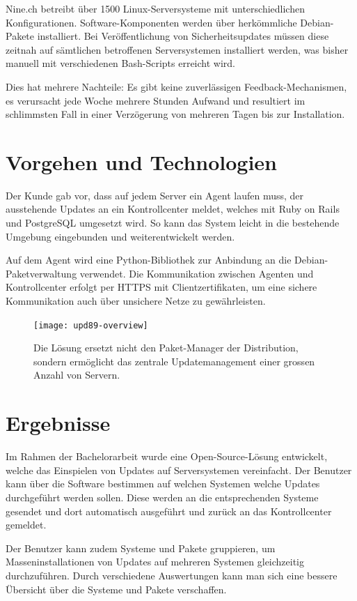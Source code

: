 Nine.ch betreibt über 1500 Linux-Serversysteme mit unterschiedlichen Konfigurationen. Software-Komponenten werden über herkömmliche Debian-Pakete installiert. Bei Veröffentlichung von Sicherheitsupdates müssen diese zeitnah auf sämtlichen betroffenen Serversystemen installiert werden, was bisher manuell mit verschiedenen Bash-Scripts erreicht wird.

Dies hat mehrere Nachteile: Es gibt keine zuverlässigen Feedback-Mechanismen, es verursacht jede Woche mehrere Stunden Aufwand und resultiert im schlimmsten Fall in einer Verzögerung von mehreren Tagen bis zur Installation.

\section*{Vorgehen und Technologien}

Der Kunde gab vor, dass auf jedem Server ein Agent laufen muss, der ausstehende Updates an ein Kontrollcenter meldet, welches mit Ruby on Rails und PostgreSQL umgesetzt wird. So kann das System leicht in die bestehende Umgebung eingebunden und weiterentwickelt werden. 

Auf dem Agent wird eine Python-Bibliothek zur Anbindung an die Debian-Paketverwaltung verwendet. Die Kommunikation zwischen Agenten und Kontrollcenter erfolgt per HTTPS mit Clientzertifikaten, um eine sichere Kommunikation auch über unsichere Netze zu gewährleisten.

\begin{figure}
  \centering
    \texttt{[image: upd89-overview]}
  \caption{Die Lösung ersetzt nicht den Paket-Manager der Distribution, sondern ermöglicht das zentrale Updatemanagement einer grossen Anzahl von Servern.}
  \label{fig:overview}
\end{figure}

\section*{Ergebnisse}   

Im Rahmen der Bachelorarbeit wurde eine Open-Source-Lösung entwickelt, welche das Einspielen von Updates auf Serversystemen vereinfacht. Der Benutzer kann über die Software bestimmen auf welchen Systemen welche Updates durchgeführt werden sollen. Diese werden an die entsprechenden Systeme gesendet und dort automatisch ausgeführt und zurück an das Kontrollcenter gemeldet.


Der Benutzer kann zudem Systeme und Pakete gruppieren, um Masseninstallationen von Updates auf mehreren Systemen gleichzeitig durchzuführen. Durch verschiedene Auswertungen kann man sich eine bessere Übersicht über die Systeme und Pakete verschaffen.

